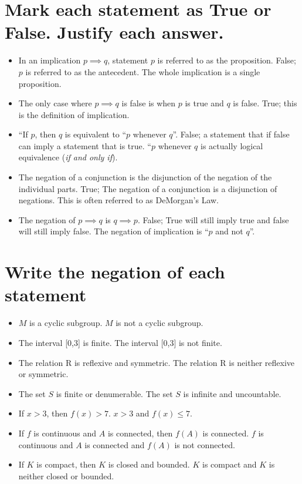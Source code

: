 \documentclass[11pt]{article} %
\begin{document}
\section{Mark each statement as True or False. Justify each answer.}
\begin{itemize}
	\item In an implication $p \implies q$, statement $p$ is referred to as the proposition.
	\subitem False; $p$ is referred to as the antecedent. The whole implication is a single proposition.
	
	\item The only case where $p \implies q$ is false is when $p$ is true and $q$ is false.
	\subitem True; this is the definition of implication.
	
	\item ``If $p$, then $q$ is equivalent to ``$p$ whenever $q$''.
	\subitem False; a statement that if false can imply a statement that is true. ``$p$ whenever $q$ is actually logical equivalence (\textit{if and only if}).
	
	\item The negation of a conjunction is the disjunction of the negation of the individual parts.
	\subitem True; The negation of a conjunction is a disjunction of negations. This is often referred to as DeMorgan's Law.
	
	\item The negation of $p \implies q$ is $q \implies p$.
	\subitem False; True will still imply true and false will still imply false. The negation of implication is ``$p$ and not $q$''.
	
\end{itemize}

\section{Write the negation of each statement}
\begin{itemize}
	\item$M$ is a cyclic subgroup.
	\subitem $M$ is not a cyclic subgroup.
	
	\item The interval [0,3] is finite.
	\subitem The interval [0,3] is not finite.
	
	\item The relation R is reflexive and symmetric.
	\subitem The relation R is neither reflexive or symmetric.
	
	\item The set $S$ is finite or denumerable.
	\subitem The set $S$ is infinite and uncountable.
	
	\item If $x>3$, then $f(x)>7$.
	\subitem $x>3$ and $f(x) \leq 7$.
	
	\item If $f$ is continuous and $A$ is connected, then $f(A)$ is connected.
	\subitem $f$ is continuous and $A$ is connected and $f(A)$ is not connected.
	
	\item If $K$ is compact, then $K$ is closed and bounded.
	\subitem $K$ is compact and $K$ is neither closed or bounded.
\end{itemize}
\end{document}
